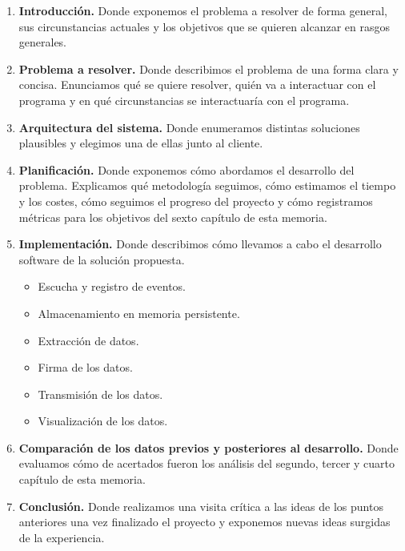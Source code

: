 \begin{enumerate}
    \item \textbf{Introducción.} Donde exponemos el problema a resolver de forma general,
    sus circunstancias actuales y los objetivos que se quieren alcanzar en rasgos generales.

    \item \textbf{Problema a resolver.} Donde describimos el problema de una forma clara y concisa.
    Enunciamos qué se quiere resolver, quién va a interactuar con el programa y en qué circunstancias
    se interactuaría con el programa.

    \item \textbf{Arquitectura del sistema.} Donde enumeramos distintas soluciones plausibles
    y elegimos una de ellas junto al cliente.

    \item \textbf{Planificación.} Donde exponemos cómo abordamos el desarrollo del problema.
    Explicamos qué metodología seguimos, cómo estimamos el tiempo y los costes, cómo seguimos el progreso
    del proyecto y cómo registramos métricas para los objetivos del sexto capítulo de esta memoria.

    \item \textbf{Implementación.} Donde describimos cómo llevamos a cabo el desarrollo software
    de la solución propuesta.
    \begin{itemize}
        \item Escucha y registro de eventos.
        \item Almacenamiento en memoria persistente.
        \item Extracción de datos.
        \item Firma de los datos.
        \item Transmisión de los datos.
        \item Visualización de los datos.
    \end{itemize}

    \item \textbf{Comparación de los datos previos y posteriores al desarrollo.} Donde evaluamos cómo de
    acertados fueron los análisis del segundo, tercer y cuarto capítulo de esta memoria.

    \item \textbf{Conclusión.} Donde realizamos una visita crítica a las ideas de los puntos
    anteriores una vez finalizado el proyecto y exponemos nuevas ideas surgidas de la experiencia.
\end{enumerate}
